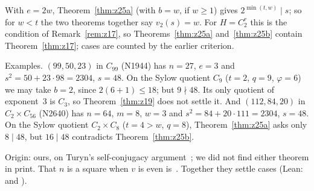 \begin{remark}\label{rem:z25}
With $e = 2w$, Theorem~\ref{thm:z25a} (with $b = w$, if $w \ge 1$) gives $2^{\min(t,w)} \mid s$; so for
$w < t$ the two theorems together say $v_2(s) = w$. For $H = C_2^r$ this is the condition of
Remark~\ref{rem:z17}, so Theorems~\ref{thm:z25a} and~\ref{thm:z25b} contain
Theorem~\ref{thm:z17}; cases are counted by the earlier criterion.

Examples. $(99,50,23)$ in $C_{99}$ (N1944) has $n = 27$, $e = 3$ and $s^2 = 50 + 23 \cdot 98 =
2304$, $s = 48$. On the Sylow quotient $C_9$ ($t = 2$, $q = 9$, $\varphi = 6$) we may take
$b = 2$, since $2(6 + 1) \le 18$; but $9 \nmid 48$. Its only quotient of exponent~$3$ is $C_3$, so
Theorem~\ref{thm:z19} does not settle it. And $(112,84,20)$ in $C_2 \times C_{56}$ (N2640) has
$n = 64$, $m = 8$, $w = 3$ and $s^2 = 84 + 20 \cdot 111 = 2304$, $s = 48$. On the Sylow quotient
$C_2 \times C_8$ ($t = 4 > w$, $q = 8$), Theorem~\ref{thm:z25a} asks only $8 \mid 48$, but
$16 \mid 48$ contradicts Theorem~\ref{thm:z25b}.

Origin: ours, on Turyn's self-conjugacy argument~\cite{turyn}; we did not find either theorem in
print. That $n$ is a square when $v$ is even is~\cite[Thm.~4.2]{he-wu}. Together they settle
 cases (Lean:  and
).
\end{remark}

